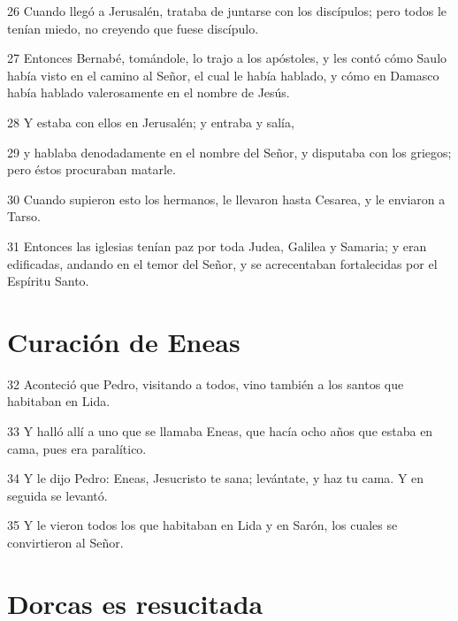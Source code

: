 \par 26 Cuando llegó a Jerusalén, trataba de juntarse con los discípulos; pero todos le tenían miedo, no creyendo que fuese discípulo.
\par 27 Entonces Bernabé, tomándole, lo trajo a los apóstoles, y les contó cómo Saulo había visto en el camino al Señor, el cual le había hablado, y cómo en Damasco había hablado valerosamente en el nombre de Jesús.
\par 28 Y estaba con ellos en Jerusalén; y entraba y salía,
\par 29 y hablaba denodadamente en el nombre del Señor, y disputaba con los griegos; pero éstos procuraban matarle.
\par 30 Cuando supieron esto los hermanos, le llevaron hasta Cesarea, y le enviaron a Tarso.
\par 31 Entonces las iglesias tenían paz por toda Judea, Galilea y Samaria; y eran edificadas, andando en el temor del Señor, y se acrecentaban fortalecidas por el Espíritu Santo.

\section*{Curación de Eneas}

\par 32 Aconteció que Pedro, visitando a todos, vino también a los santos que habitaban en Lida.
\par 33 Y halló allí a uno que se llamaba Eneas, que hacía ocho años que estaba en cama, pues era paralítico.
\par 34 Y le dijo Pedro: Eneas, Jesucristo te sana; levántate, y haz tu cama. Y en seguida se levantó.
\par 35 Y le vieron todos los que habitaban en Lida y en Sarón, los cuales se convirtieron al Señor.

\section*{Dorcas es resucitada}

